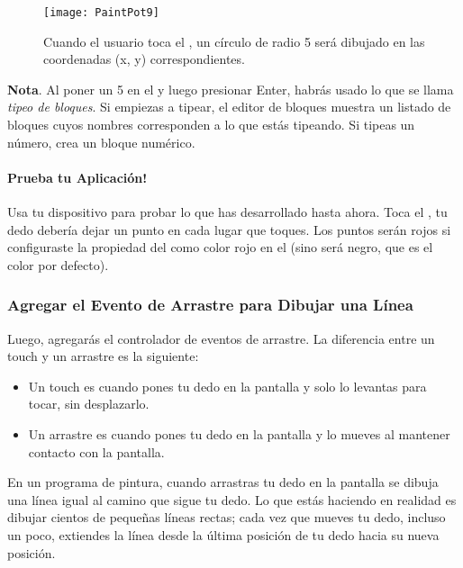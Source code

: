 \begin{enumerate}
\begin{figure}[H]
\vspace{3em}
\centering
\texttt{[image: PaintPot9]}
\caption{Cuando el usuario toca el , un
  círculo de radio 5 será dibujado en las coordenadas (x, y)
  correspondientes.}
\label{fig:PaintPot9}
\end{figure}

  \textbf{Nota}. Al poner un 5 en el \blockEditor y luego presionar
  Enter, habrás usado lo que se llama \emph{tipeo de bloques}. Si
  empiezas a tipear, el editor de bloques muestra un listado de
  bloques cuyos nombres corresponden a lo que estás tipeando. Si
  tipeas un número, crea un bloque numérico.

  \paragraph{Prueba tu Aplicación!} Usa tu dispositivo para probar lo
  que has desarrollado hasta ahora. Toca el
  , tu dedo debería dejar un punto en cada
  lugar que toques. Los puntos serán rojos si configuraste la
  propiedad del  como color
  rojo en el \designer (sino será negro, que es el color por defecto).

\end{enumerate}

\subsubsection*{Agregar el Evento de Arrastre para Dibujar una Línea}

Luego, agregarás el controlador de eventos de arrastre. La diferencia
entre un touch y un arrastre es la siguiente:
	
\begin{itemize}
\item Un touch es cuando pones tu dedo en la pantalla y solo lo
  levantas para tocar, sin desplazarlo.

\item Un arrastre es cuando pones tu dedo en la pantalla y lo mueves
  al mantener contacto con la pantalla.
\end{itemize}
	
En un programa de pintura, cuando arrastras tu dedo en la pantalla se
dibuja una línea igual al camino que sigue tu dedo. Lo que estás
haciendo en realidad es dibujar cientos de pequeñas líneas rectas;
cada vez que mueves tu dedo, incluso un poco, extiendes la línea desde
la última posición de tu dedo hacia su nueva posición.

